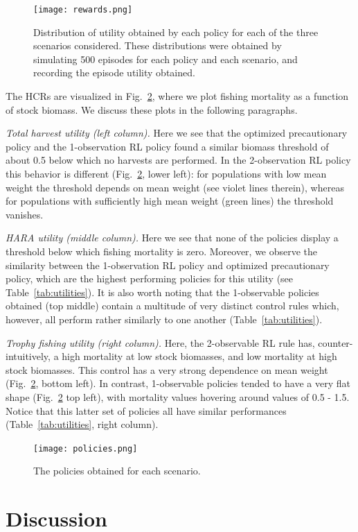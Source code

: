\documentclass[floatfix,nofootinbib,longbibliography,notitlepage]{revtex4-2}
\begin{document}
\begin{figure}[h!]
	\texttt{[image: rewards.png]}
\caption{
\label{fig:rewards}
Distribution of utility obtained by each policy for each of the three scenarios considered.
These distributions were obtained by simulating 500 episodes for each policy and each scenario, and recording the episode utility obtained.
}
\end{figure}

The HCRs are visualized in Fig.~\ref{fig:policies}, where we plot fishing mortality as a function of stock biomass. 
We discuss these plots in the following paragraphs.

\emph{Total harvest utility (left column).} 
Here we see that the optimized precautionary policy and the 1-observation RL policy found a similar biomass threshold of about 0.5 below which no harvests are performed. 
In the 2-observation RL policy this behavior is different (Fig.~\ref{fig:policies}, lower left): for populations with low mean weight the threshold depends on mean weight (see violet lines therein), whereas for populations with sufficiently high mean weight (green lines) the threshold vanishes.

\emph{HARA utility (middle column).} 
Here we see that none of the policies display a threshold below which fishing mortality is zero. 
Moreover, we observe the similarity between the 1-observation RL policy and optimized precautionary policy, which are the highest performing policies for this utility (see Table~\ref{tab:utilities}). 
It is also worth noting that the 1-observable policies obtained (top middle) contain a multitude of very distinct control rules which, however, all perform rather similarly to one another (Table~\ref{tab:utilities}).

\emph{Trophy fishing utility (right column).} 
Here, the 2-observable RL rule has, counter-intuitively, a high mortality at low stock biomasses, and low mortality at high stock biomasses. 
This control has a very strong dependence on mean weight (Fig.~\ref{fig:policies}, bottom left). In contrast, 1-observable policies tended to have a very flat shape (Fig.~\ref{fig:policies} top left), with mortality values hovering around values of 0.5 - 1.5. Notice that this latter set of policies all have similar performances (Table~\ref{tab:utilities}, right column).

\begin{figure}[h!]
	\texttt{[image: policies.png]}
\caption{
\label{fig:policies}
The policies obtained for each scenario.
}
\end{figure}



%
%
%
\section{Discussion}




 

\end{document}
